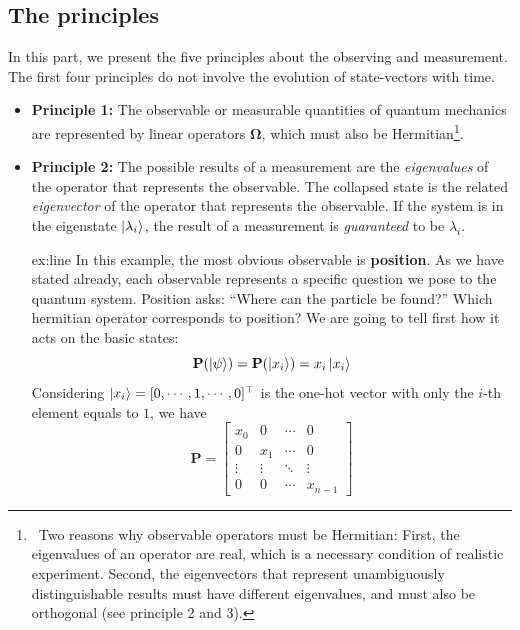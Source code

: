\documentclass{easyclass}
\begin{document}
\subsection{The principles}
In this part, we present the five principles about the observing and measurement. The first four principles do not involve the evolution of state-vectors with time. 
\begin{itemize}
	\item \textbf{Principle 1:} The observable or measurable quantities of quantum mechanics are represented by linear operators $\mathbf{\Omega}$, which must also be Hermitian\footnote{\ Two reasons why observable operators must be Hermitian: First, the eigenvalues of an operator are real, which is a necessary condition of realistic experiment. Second, the eigenvectors that represent unambiguously distinguishable results must have different eigenvalues, and must also be orthogonal (see principle 2 and 3).}.
	
	\item \textbf{Principle 2:} The possible results of a measurement are the \textit{eigenvalues} of the operator that represents the observable. The collapsed state is the related \textit{eigenvector} of the operator that represents the observable. If the system is in the eigenstate $\ket{\lambda_i}$, the result of a measurement is \textit{guaranteed} to be $\lambda_i$.

	\begin{example}{ex:line}
		In this example, the most obvious observable is \textbf{position}. As we have stated
		already, each observable represents a specific question we pose to the quantum
		system. Position asks: “Where can the particle be found?” Which hermitian operator corresponds to position? We are going to tell first how it acts on the basic
		states:
		\begin{equation}
			\mathbf{P}(\ket{\psi})=\mathbf{P}(\ket{x_i})=x_i\ket{x_i}
		\end{equation}
		Considering $\ket{x_i}=[0,\cdots,1,\cdots,0]^{\top}$ is the one-hot vector with only the $i$-th element equals to $1$, we have 
		\begin{equation}
			\mathbf{P}=\begin{bmatrix}
				x_0 & 0 & \cdots & 0\\
				0 & x_1 & \cdots & 0\\
				\vdots & \vdots & \ddots & \vdots\\
				0 & 0 & \cdots & x_{n-1}
				\end{bmatrix}
		\end{equation} 
	\end{example}
	

\end{itemize}
\end{document}
